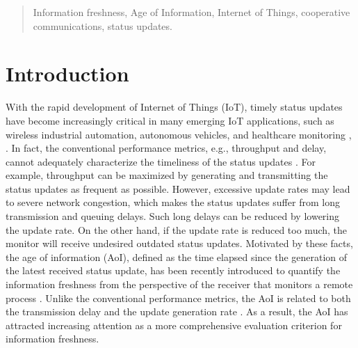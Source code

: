 \documentclass{IEEEtran}
\begin{document}
\begin{abstract}

\begin{IEEEkeywords}
		Information freshness, Age of Information, Internet of Things,  cooperative communications, status updates. 
\end{IEEEkeywords}

	
	
	

\end{abstract}

\section{Introduction}
With the rapid development of Internet of Things (IoT), timely status updates have become increasingly critical in many emerging IoT applications, such as wireless industrial automation,  autonomous vehicles, and healthcare monitoring \cite{b11}, \cite{b10}. In fact, the conventional performance metrics, e.g., throughput and delay, cannot adequately characterize the timeliness of the status updates \cite{b12}. For example, throughput can be maximized by generating and transmitting the status updates as frequent as possible. However, excessive update rates may lead to severe network congestion, which makes the status updates suffer from long transmission and queuing delays. Such long delays can be reduced by lowering the update rate. On the other hand, if the update rate is reduced too much, the monitor will receive undesired outdated status updates. Motivated by these facts, the age of information (AoI), defined as the time elapsed since the generation of the latest received status update, has been recently introduced to quantify the information freshness from the perspective of the receiver that monitors a remote process \cite{b14}. Unlike the conventional performance metrics, the AoI is related to both the transmission delay and the update generation rate \cite{b13}. As a result, the AoI has attracted increasing attention as a more comprehensive evaluation criterion for information freshness.
\end{document}
